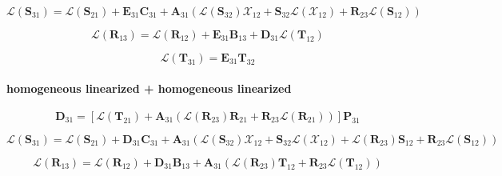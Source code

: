 \begin{equation}
\mathcal{L}(\mathbf{S}_{31}) = \mathcal{L}(\mathbf{S}_{21}) + \mathbf{E}_{31}\mathbf{C}_{31} + \mathbf{A}_{31}(\mathcal{L}(\mathbf{S}_{32})\mathcal{X}_{12} + \mathbf{S}_{32}\mathcal{L}(\mathcal{X}_{12}) + \mathbf{R}_{23}\mathcal{L}(\mathbf{S}_{12}))
\label{eq:adding-upward-tangent_linear-homogeneous_linearized_p_particular_linearized-V31}
\end{equation}

\begin{equation}
\mathcal{L}(\mathbf{R}_{13}) = \mathcal{L}(\mathbf{R}_{12}) + \mathbf{E}_{31}\mathbf{B}_{13} + \mathbf{D}_{31}\mathcal{L}(\mathbf{T}_{12})
\label{eq:adding-upward-tangent_linear-homogeneous_linearized_p_particular_linearized-U13}
\end{equation}

\begin{equation}
\mathcal{L}(\mathbf{T}_{31}) = \mathbf{E}_{31}\mathbf{T}_{32}
\label{eq:adding-upward-tangent_linear-homogeneous_linearized_p_particular_linearized-W31}
\end{equation}


\paragraph{homogeneous linearized + homogeneous linearized}
\label{sec:adding-upward-tangent_linear-homogeneous_linearized_p_homogeneous_linearized}

\begin{equation}
\mathbf{D}_{31} = \left[\mathcal{L}(\mathbf{T}_{21}) + \mathbf{A}_{31}(\mathcal{L}(\mathbf{R}_{23})\mathbf{R}_{21} + \mathbf{R}_{23}\mathcal{L}(\mathbf{R}_{21}))\right]\mathbf{P}_{31}
\label{eq:adding-upward-tangent_linear-homogeneous_linearized_p_homogeneous_linearized-D31}
\end{equation}

\begin{equation}
\mathcal{L}(\mathbf{S}_{31}) = \mathcal{L}(\mathbf{S}_{21}) + \mathbf{D}_{31}\mathbf{C}_{31} + \mathbf{A}_{31}(\mathcal{L}(\mathbf{S}_{32})\mathcal{X}_{12} + \mathbf{S}_{32}\mathcal{L}(\mathcal{X}_{12}) + \mathcal{L}(\mathbf{R}_{23})\mathbf{S}_{12} + \mathbf{R}_{23}\mathcal{L}(\mathbf{S}_{12}))
\label{eq:adding-upward-tangent_linear-homogeneous_linearized_p_homogeneous_linearized-V31}
\end{equation}

\begin{equation}
\mathcal{L}(\mathbf{R}_{13}) = \mathcal{L}(\mathbf{R}_{12}) + \mathbf{D}_{31}\mathbf{B}_{13} + \mathbf{A}_{31}(\mathcal{L}(\mathbf{R}_{23})\mathbf{T}_{12} + \mathbf{R}_{23}\mathcal{L}(\mathbf{T}_{12}))
\label{eq:adding-upward-tangent_linear-homogeneous_linearized_p_homogeneous_linearized-U13}
\end{equation}

